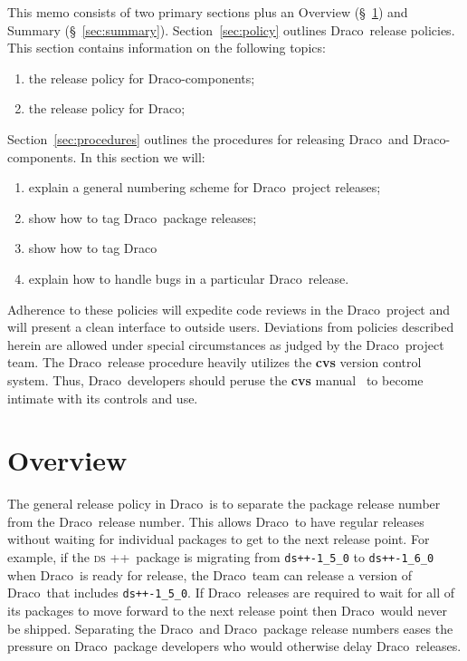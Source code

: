 \documentclass[11pt]{nmemo}
\newcommand{\draco}{{\normalfont\normalsize\textsf Draco}}
\newcommand{\dsxx}{{\normalfont\normalsize\scshape ds\raisebox{.2ex}
  {\scriptsize ++}}}
\begin{document}
This memo consists of two primary sections plus an Overview
(\S~\ref{sec:overview}) and Summary (\S~\ref{sec:summary}).
Section~\ref{sec:policy} outlines \draco\ release policies.  This
section contains information on the following topics:
\begin{enumerate}
\item the release policy for \draco-components;
\item the release policy for \draco;
\end{enumerate}
Section~\ref{sec:procedures} outlines the procedures for releasing
\draco\ and \draco-components.  In this section we will:
\begin{enumerate}
\item explain a general numbering scheme for \draco\ project releases;
\item show how to tag \draco\ package releases;
\item show how to tag \draco\;
\item explain how to handle bugs in a particular \draco\ release.
\end{enumerate}
Adherence to these policies will expedite code reviews in the \draco\ 
project and will present a clean interface to outside users.
Deviations from policies described herein are allowed under special
circumstances as judged by the \draco\ project team.  The \draco\ 
release procedure heavily utilizes the {\bf cvs} version control
system.  Thus, \draco\ developers should peruse the {\bf cvs}
manual~\cite{cvs} to become intimate with its controls and use.


\section{Overview}
\label{sec:overview}

The general release policy in \draco\ is to separate the package
release number from the \draco\ release number.  This allows \draco\ 
to have regular releases without waiting for individual packages to
get to the next release point.  For example, if the \dsxx\ package is
migrating from \texttt{ds++-1\_5\_0} to \texttt{ds++-1\_6\_0} when
\draco\ is ready for release, the \draco\ team can release a version
of \draco\ that includes \texttt{ds++-1\_5\_0}.  If \draco\ releases
are required to wait for all of its packages to move forward to the
next release point then \draco\ would never be shipped.  Separating
the \draco\ and \draco\ package release numbers eases the pressure on
\draco\ package developers who would otherwise delay \draco\ releases.
\end{document}
